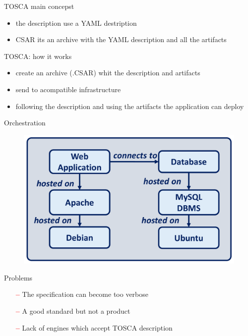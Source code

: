 \documentclass{beamer}
\begin{document}
  \begin{frame}{TOSCA main concepst}
      \begin{itemize}
        \item the description use a YAML destription
        \item CSAR its an archive with the YAML description and all the artifacts
      \end{itemize}
  \end{frame}

  \begin{frame}{TOSCA: how it works}
    \begin{itemize}
      \item create an archive (.CSAR) whit the description and artifacts
      \item send to acompatible infrastructure
      \item following the description and using the artifacts the application can deploy
    \end{itemize}
  \end{frame}

  \begin{frame}{Orchestration}
    \begin{figure}
      \includegraphics[width=\textwidth]{img/tosca_deploy.png}
    \end{figure}
  \end{frame}

  \begin{frame}{Problems}
    \begin{itemize}
      \item[\textcolor{red}{\textbf{--}}] The specification can become too verbose
      \item[\textcolor{red}{\textbf{--}}] A good standard but not a product
      \item[\textcolor{red}{\textbf{--}}] Lack of engines which accept TOSCA description
    \end{itemize}
  \end{frame}
\end{document}
